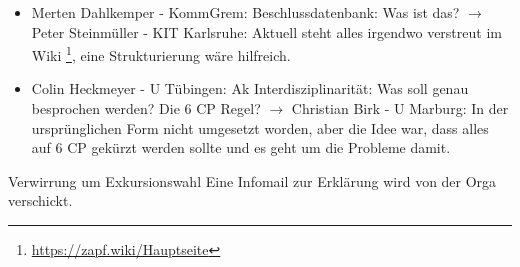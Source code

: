 \begin{itemize}
      \item Merten Dahlkemper - KommGrem:  Beschlussdatenbank: Was ist das? $\rightarrow$ Peter Steinmüller - KIT Karlsruhe:  Aktuell steht alles irgendwo verstreut im Wiki \footnote{\url{https://zapf.wiki/Hauptseite}}, eine Strukturierung wäre hilfreich.
      \item Colin Heckmeyer - U Tübingen:  Ak Interdisziplinarität: Was soll genau besprochen werden? Die 6 CP Regel? $\rightarrow$ Christian Birk - U Marburg:  In der ursprünglichen Form nicht umgesetzt worden, aber die Idee war, dass alles auf 6 CP gekürzt werden sollte und es geht um die Probleme damit.
    \end{itemize}

    \begin{info}{Verwirrung um Exkursionswahl}
      Eine Infomail zur Erklärung wird von der Orga verschickt.
    \end{info}

